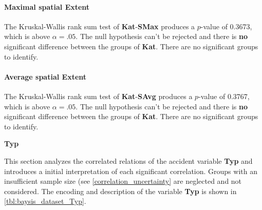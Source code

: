 \paragraph{Maximal spatial Extent}
The Kruskal-Wallis rank sum test of \textbf{Kat}-\textbf{SMax} produces a $p$-value of 0.3673, which is above $\alpha=.05$. The null hypothesis can't be rejected and there is \textbf{no} significant difference between the groups of \textbf{Kat}. There are no significant groups to identify.

\paragraph{Average spatial Extent}
The Kruskal-Wallis rank sum test of \textbf{Kat}-\textbf{SAvg} produces a $p$-value of 0.3767, which is above $\alpha=.05$. The null hypothesis can't be rejected and there is \textbf{no} significant difference between the groups of \textbf{Kat}. There are no significant groups to identify.

\Large
\centerline{\textbf{Typ}}
\normalsize
This section analyzes the correlated relations of the accident variable \textbf{Typ} and introduces a initial interpretation of each significant correlation. Groups with an insufficient sample size (see \cref{correlation_uncertainty} are neglected and not considered. The encoding and description of the variable \textbf{Typ} is shown in \cref{tbl:baysis_dataset_Typ}.

